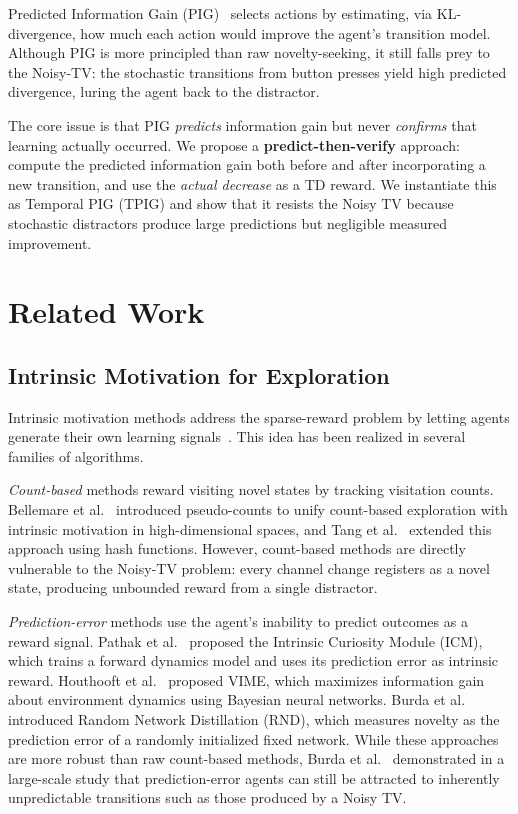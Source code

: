 \documentclass[letterpaper]{article} %
\begin{document}
Predicted Information Gain
(PIG)~\cite{10.3389/fncir.2013.00037} selects actions by estimating,
via KL-divergence, how much each action would improve the agent's
transition model.  Although PIG is more principled than raw
novelty-seeking, it still falls prey to the Noisy-TV: the stochastic
transitions from button presses yield high predicted divergence, luring
the agent back to the distractor.

The core issue is that PIG \emph{predicts} information gain but never
\emph{confirms} that learning actually occurred.  We propose a
\textbf{predict-then-verify} approach: compute the predicted
information gain both before and after incorporating a new transition,
and use the \emph{actual decrease} as a TD reward.  We instantiate
this as Temporal PIG (TPIG) and show that it resists the Noisy TV
because stochastic distractors produce large predictions but
negligible measured improvement.

\section{Related Work}

\subsection{Intrinsic Motivation for Exploration}

Intrinsic motivation methods address the sparse-reward problem by
letting agents generate their own learning
signals~\cite{DBLP:journals/corr/abs-1908-06976,FToCFaIM:Jurgen}.
This idea has been realized in several families of algorithms.

\emph{Count-based} methods reward visiting novel states by tracking
visitation counts.  Bellemare et
al.~ introduced pseudo-counts to unify
count-based exploration with intrinsic motivation in
high-dimensional spaces, and Tang et
al.~ extended this approach
using hash functions.  However, count-based methods are directly
vulnerable to the Noisy-TV problem: every channel change registers
as a novel state, producing unbounded reward from a single
distractor.

\emph{Prediction-error} methods use the agent's inability to predict
outcomes as a reward signal.  Pathak et
al.~ proposed the Intrinsic Curiosity Module
(ICM), which trains a forward dynamics model and uses its prediction
error as intrinsic reward.  Houthooft et
al.~ proposed VIME, which maximizes information gain
about environment dynamics using Bayesian neural networks.  Burda et
al.~ introduced Random Network Distillation (RND),
which measures novelty as the prediction error of a randomly
initialized fixed network.  While these approaches are more robust
than raw count-based methods, Burda et
al.~ demonstrated in a large-scale study
that prediction-error agents can still be attracted to inherently
unpredictable transitions such as those produced by a Noisy TV.
\end{document}
